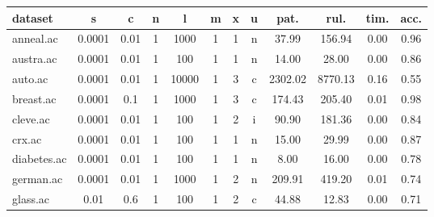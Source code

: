 \begin{table}[htbp]
	\centering
		\renewcommand{\tabcolsep}{1.8mm}
		\resizebox{0.95\textwidth}{!} {
		\begin{tabular}{|l|c|c|c|c|c|c|c||c|c|c|c|}
		\hline
		\textbf{dataset}	& \textbf{s}	& \textbf{c}	& \textbf{n}	& \textbf{l}	& \textbf{m}	& \textbf{x}	& \textbf{u}	& \textbf{pat.}	& \textbf{rul.}	& \textbf{tim.}	& \textbf{acc.}	\\
		\hline
		anneal.ac      & 0.0001   & 0.01        & 1              & 1000                & 1             & 1      & n             & 37.99          & 156.94         & 0.00           & 0.96           \\
		\hline
		austra.ac      & 0.0001   & 0.01        & 1              & 100                 & 1             & 1      & n             & 14.00          & 28.00          & 0.00           & 0.86           \\
		\hline
		auto.ac        & 0.0001   & 0.01        & 1              & 10000               & 1             & 3      & c             & 2302.02        & 8770.13        & 0.16           & 0.55           \\
		\hline
		breast.ac      & 0.0001   & 0.1         & 1              & 1000                & 1             & 3      & c             & 174.43         & 205.40         & 0.01           & 0.98           \\
		\hline
		cleve.ac       & 0.0001   & 0.01        & 1              & 100                 & 1             & 2      & i             & 90.90          & 181.36         & 0.00           & 0.84           \\
		\hline
		crx.ac         & 0.0001   & 0.01        & 1              & 100                 & 1             & 1      & n             & 15.00          & 29.99          & 0.00           & 0.87           \\
		\hline
		diabetes.ac    & 0.0001   & 0.01        & 1              & 100                 & 1             & 1      & n             & 8.00           & 16.00          & 0.00           & 0.78           \\
		\hline
		german.ac      & 0.0001   & 0.01        & 1              & 1000                & 1             & 2      & n             & 209.91         & 419.20         & 0.01           & 0.74           \\
		\hline
		glass.ac       & 0.01     & 0.6         & 1              & 100                 & 1             & 2      & c             & 44.88          & 12.83          & 0.00           & 0.71           \\

\end{tabular}}
\end{table}
